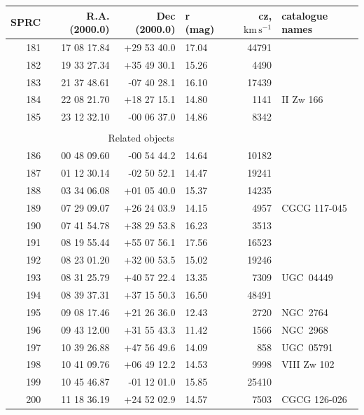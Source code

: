 \documentclass[useAMS,usenatbib]{mn2e}
\newcommand{\km}{\,\mbox{km}\,\mbox{s}^{-1}}
\begin{document}
  \begin{table}
 \contcaption{ }
 \begin{tabular}{rrrlrl}
 \hline
SPRC  &  R.A. (2000.0)   &  Dec (2000.0)  &  r (mag)     & cz, $\km$& catalogue names  \\
 \hline
 181 &  17 08 17.84 & +29 53 40.0 &  17.04 &  44791 &                  \\
 182 &  19 33 27.34 & +35 49 30.1 &  15.26 &   4490 &                  \\
 183 &  21 37 48.61 & -07 40 28.1 &  16.10 &  17439 &                  \\
 184 &  22 08 21.70 & +18 27 15.1 &  14.80 &   1141 &      II Zw 166   \\
 185 &  23 12 32.10 & -00 06 37.0 &  14.86 &   8342 &                  \\
\multicolumn{5}{c}{ }\\
\multicolumn{5}{c}{Related objects}\\
 186 &  00 48 09.60 & -00 54 44.2 &  14.64 &  10182 &                  \\
 187 &  01 12 30.14 & -02 50 52.1 &  14.47 &  19241 &                  \\
 188 &  03 34 06.08 & +01 05 40.0 &  15.37 &  14235 &                  \\
 189 &  07 29 09.07 & +26 24 03.9 &  14.15 &   4957 &    CGCG 117-045  \\
 190 &  07 41 54.78 & +38 29 53.8 &  16.23 &   3513 &                  \\
 191 &  08 19 55.44 & +55 07 56.1 &  17.56 &  16523 &                  \\
 192 &  08 23 01.20 & +32 00 53.5 &  15.02 &  19246 &                  \\
 193 &  08 31 25.79 & +40 57 22.4 &  13.35 &   7309 &       UGC~04449  \\
 194 &  08 39 37.31 & +37 15 50.3 &  16.50 &  48491 &                  \\
 195 &  09 08 17.46 & +21 26 36.0 &  12.43 &   2720 &        NGC~2764  \\
 196 &  09 43 12.00 & +31 55 43.3 &  11.42 &   1566 &        NGC~2968  \\
 197 &  10 39 26.88 & +47 56 49.6 &  14.09 &    858 &       UGC~05791  \\
 198 &  10 41 09.76 & +06 49 12.2 &  14.53 &   9998 &      VIII Zw 102 \\
 199 &  10 45 46.87 & -01 12 01.0 &  15.85 &  25410 &                  \\
 200 &  11 18 36.19 & +24 52 02.9 &  14.57 &   7503 &     CGCG 126-026 \\

\end{tabular}
\end{table}
\end{document}

